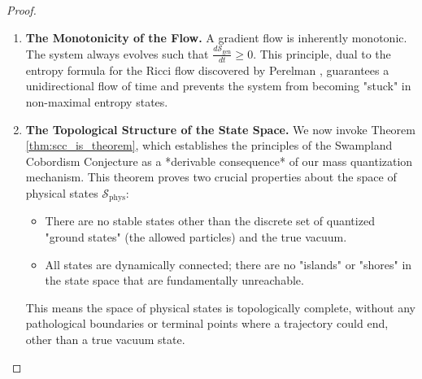 \documentclass[11pt, letterpaper]{report}
\theoremstyle{plain} %
\theoremstyle{definition} %
\theoremstyle{remark} %
\begin{document}
\begin{proof}
\begin{enumerate}
    \item \textbf{The Monotonicity of the Flow.}
    A gradient flow is inherently monotonic. The system always evolves such that $\frac{d\mathcal{S}_{\text{gen}}}{dt} \ge 0$. This principle, dual to the entropy formula for the Ricci flow discovered by Perelman \cite{Perelman2002}, guarantees a unidirectional flow of time and prevents the system from becoming "stuck" in non-maximal entropy states.

    \item \textbf{The Topological Structure of the State Space.}
    We now invoke Theorem \ref{thm:scc_is_theorem}, which establishes the principles of the Swampland Cobordism Conjecture as a *derivable consequence* of our mass quantization mechanism. This theorem proves two crucial properties about the space of physical states $\mathcal{S}_{\text{phys}}$:
    \begin{itemize}
        \item There are no stable states other than the discrete set of quantized "ground states" (the allowed particles) and the true vacuum.
        \item All states are dynamically connected; there are no "islands" or "shores" in the state space that are fundamentally unreachable.
    \end{itemize}
    This means the space of physical states is topologically complete, without any pathological boundaries or terminal points where a trajectory could end, other than a true vacuum state.


\end{enumerate}
\end{proof}
\end{document}

